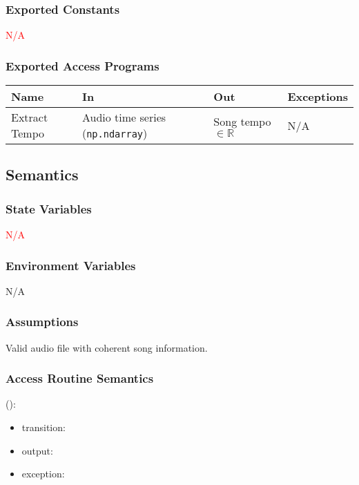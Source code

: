 \documentclass[12pt, titlepage]{article}
\begin{document}
\subsubsection{Exported Constants}
\textcolor{red}{N/A}

\subsubsection{Exported Access Programs}

\begin{center}
\begin{tabular}{p{2cm} p{4cm} p{4cm} p{2cm}}
\hline
\textbf{Name} & \textbf{In} & \textbf{Out} & \textbf{Exceptions}\\
\hline%
Extract Tempo &Audio time series (\texttt{np.ndarray}) & Song tempo $\in \mathbb{R}$ & N/A \\
\hline
\end{tabular}
\end{center}

\subsection{Semantics}

\subsubsection{State Variables}
\textcolor{red}{N/A}

\subsubsection{Environment Variables}
N/A

\subsubsection{Assumptions}
Valid audio file with coherent song information.

\subsubsection{Access Routine Semantics}

\noindent {}():
\begin{itemize}
\item transition:  
\item output:  
\item exception:  
\end{itemize}
\end{document}
